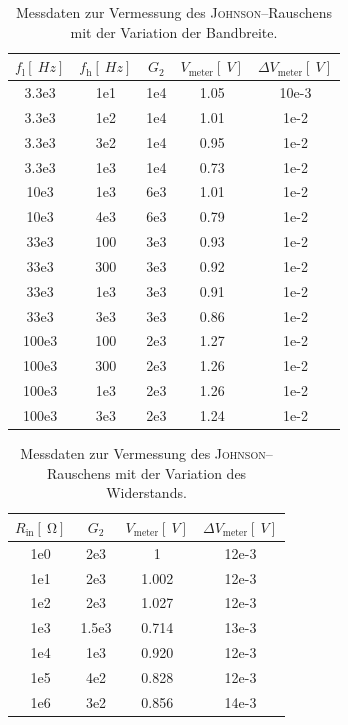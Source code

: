 \documentclass[sn-mathphys-num,iicol]{sn-jnl}
\theoremstyle{thmstyleone}
\theoremstyle{thmstyletwo}
\theoremstyle{thmstylethree}
\begin{document}
\begin{table}[h]
  \begin{tabular}{S[table-format=3.1e1] S[table-format=3e1] S[table-format=1e1] S[table-format=1.2] S[table-format=2e1]}
    \toprule
    $f_\text{l}[\SI{}{Hz}]$ & $f_\text{h}[\SI{}{Hz}]$ & $G_{2}$ & $V_\text{meter}\left[\SI{}{V}\right]$ & $\Delta V_\text{meter}\left[\SI{}{V}\right]$ \\
    \midrule
    3.3e3&1e1&1e4&1.05&10e-3\\
    3.3e3&1e2&1e4&1.01&1e-2\\
    3.3e3&3e2&1e4&0.95&1e-2\\
    3.3e3&1e3&1e4&0.73&1e-2\\
    10e3&1e3&6e3&1.01&1e-2\\
    10e3&4e3&6e3&0.79&1e-2\\
    33e3&100&3e3&0.93&1e-2\\
    33e3&300&3e3&0.92&1e-2\\
    33e3&1e3&3e3&0.91&1e-2\\
    33e3&3e3&3e3&0.86&1e-2\\
    100e3&100&2e3&1.27&1e-2\\
    100e3&300&2e3&1.26&1e-2\\
    100e3&1e3&2e3&1.26&1e-2\\
    100e3&3e3&2e3&1.24&1e-2\\
    \bottomrule
  \end{tabular}
  \caption{Messdaten zur Vermessung des \textsc{Johnson}--Rauschens mit der Variation der Bandbreite.}
\end{table}

\begin{table}[h]
    \begin{tabular}{S[table-format=1e1]S[table-format=1.1e1]S[table-format=1.3]S[table-format=2e1]}
    \toprule
    $R_\text{in}[\SI{}{\ohm}]$ & $G_{2}$ & $V_\text{meter}[\SI{}{V}]$ & $\Delta V_\text{meter}[\SI{}{V}]$ \\
    \midrule
    1e0&2e3&1&12e-3\\
    1e1&2e3&1.002&12e-3\\
    1e2&2e3&1.027&12e-3\\
    1e3&1.5e3&0.714&13e-3\\
    1e4&1e3&0.920&12e-3\\
    1e5&4e2&0.828&12e-3\\
    1e6&3e2&0.856&14e-3\\
    \bottomrule
  \end{tabular}
  \caption{Messdaten zur Vermessung des \textsc{Johnson}--Rauschens mit der Variation des Widerstands.}
\end{table}
\end{document}
